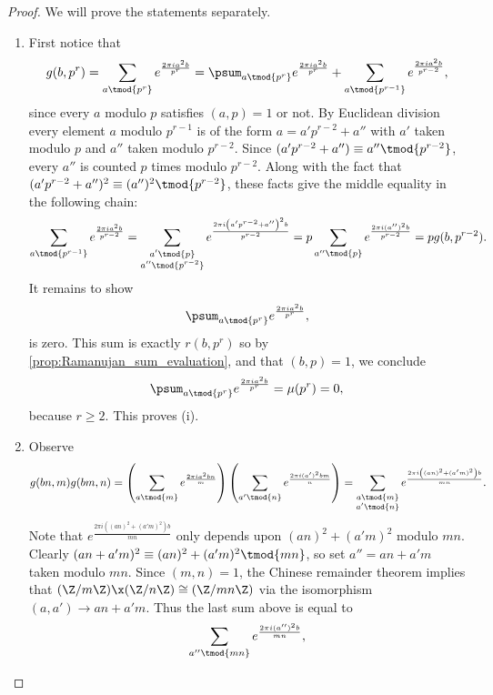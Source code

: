         \begin{proof}
          We will prove the statements separately.
          \begin{enumerate}[label=(\roman*)]
            \item First notice that
            \[
              g(b,p^{r}) = \sum_{a \tmod{p^{r}}}e^{\frac{2\pi ia^{2}b}{p^{r}}} = \psum_{a \tmod{p^{r}}}e^{\frac{2\pi ia^{2}b}{p^{r}}}+\sum_{a \tmod{p^{r-1}}}e^{\frac{2\pi ia^{2}b}{p^{r-2}}},
            \]
            since every $a$ modulo $p$ satisfies $(a,p) = 1$ or not. By Euclidean division every element $a$ modulo $p^{r-1}$ is of the form $a = a'p^{r-2}+a''$ with $a'$ taken modulo $p$ and $a''$ taken modulo $p^{r-2}$. Since $(a'p^{r-2}+a'') \equiv a'' \tmod{p^{r-2}}$, every $a''$ is counted $p$ times modulo $p^{r-2}$. Along with the fact that $(a'p^{r-2}+a'')^{2} \equiv (a'')^{2} \tmod{p^{r-2}}$, these facts give the middle equality in the following chain:
            \[
              \sum_{a \tmod{p^{r-1}}}e^{\frac{2\pi ia^{2}b}{p^{r-2}}} = \sum_{\substack{a' \tmod{p} \\ a'' \tmod{p^{r-2}}}}e^{\frac{2\pi i\left(a'p^{r-2}+a''\right)^{2}b}{p^{r-2}}} = p\sum_{a'' \tmod{p}}e^{\frac{2\pi i(a'')^{2}b}{p^{r-2}}} = pg(b,p^{r-2}).
            \]
            It remains to show
            \[
              \psum_{a \tmod{p^{r}}}e^{\frac{2\pi ia^{2}b}{p^{r}}},
            \]
            is zero. This sum is exactly $r(b,p^{r})$ so by \cref{prop:Ramanujan_sum_evaluation}, and that $(b,p) = 1$, we conclude
            \[
              \psum_{a \tmod{p^{r}}}e^{\frac{2\pi ia^{2}b}{p^{r}}} = \mu(p^{r}) = 0,
            \]
            because $r \ge 2$. This proves (i).
            \item Observe
              \[
                g(bn,m)g(bm,n) = \left(\sum_{a \tmod{m}}e^{\frac{2\pi ia^{2}bn}{m}}\right)\left(\sum_{a' \tmod{n}}e^{\frac{2\pi i(a')^{2}bm}{n}}\right) = \sum_{\substack{a \tmod{m} \\ a' \tmod{n}}}e^{\frac{2\pi i\left((an)^{2}+(a'm)^{2}\right)b}{mn}}.
              \]
              Note that $e^{\frac{2\pi i\left((an)^{2}+(a'm)^{2}\right)b}{mn}}$ only depends upon $(an)^{2}+(a'm)^{2}$ modulo $mn$. Clearly $(an+a'm)^{2} \equiv (an)^{2}+(a'm)^{2} \tmod{mn}$, so set $a'' = an+a'm$ taken modulo $mn$. Since $(m,n) = 1$, the Chinese remainder theorem implies that $(\Z/m\Z) \x (\Z/n\Z) \cong (\Z/mn\Z)$ via the isomorphism $(a,a') \to an+a'm$. Thus the last sum above is equal to
              \[
                \sum_{a'' \tmod{mn}}e^{\frac{2\pi i(a'')^{2}b}{mn}},
\]
\end{enumerate}
\end{proof}

